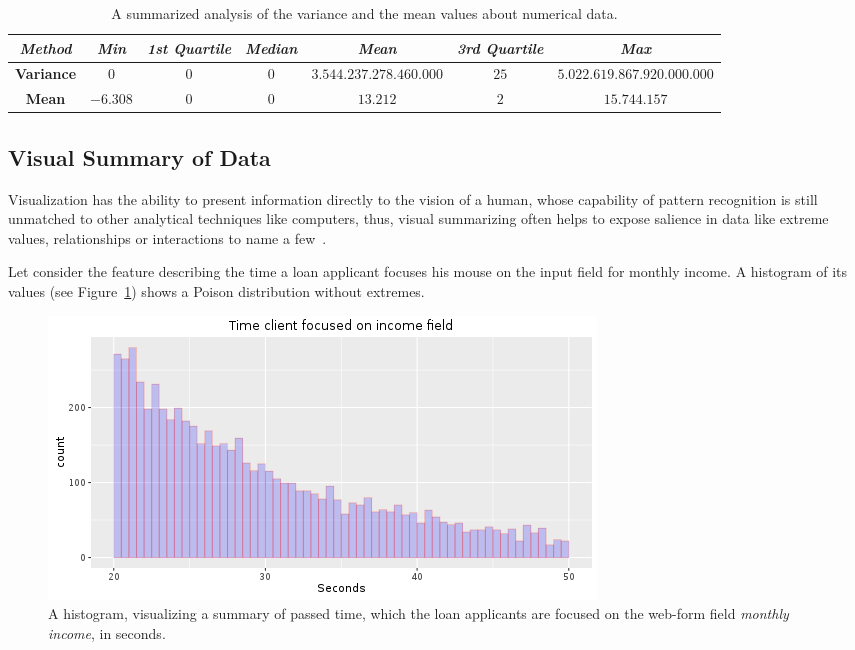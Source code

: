 \begin{table}[h!]
  \begin{center}
    \caption{A summarized analysis of the variance and the mean values about numerical data.}
    \label{tab:summarized-analysis}
    \hspace*{-2cm}\begin{tabular}{|c|c|c|c|c|c|c|}  \hline
    \textit{Method} & \textit{Min} & \textit{1st Quartile} & \textit{Median} & \textit{Mean} & \textit{3rd Quartile} & \textit{Max}  \\
      \hline
    \textbf{Variance} & \(0\) & \(0\) & \(0\) & \(3.544.237.278.460.000\) & \(25\) & \(5.022.619.867.920.000.000\) \\
     \hline
     \textbf{Mean} & \(-6.308\) & \(0\) & \(0\) & \(13.212\) & \(2\) & \(15.744.157\) \\
    \hline 
    \end{tabular}
  \end{center}
\end{table}



\subsection{Visual Summary of Data}\label{Ch:2:VSummary} 
Visualization has the ability to present information directly to the vision of a human, whose capability of pattern recognition is still unmatched to other analytical techniques like computers, thus, visual summarizing often helps to expose salience in data like extreme values, relationships or interactions to name a few~\cite{993180}. 

Let consider the feature describing the time a loan applicant focuses his mouse on the input field for monthly income.  A histogram of its values (see Figure~\ref{fig:time-focused}) shows a Poison distribution without extremes. 
\begin{figure}[h!]
    \centering
    \includegraphics[scale=0.7]{Graphics/time_client_on_income.png}
    \caption{A histogram, visualizing a summary of passed time, which the loan applicants are focused on the web-form field \textit{monthly income}, in seconds.}
    \label{fig:time-focused}
\end{figure}

